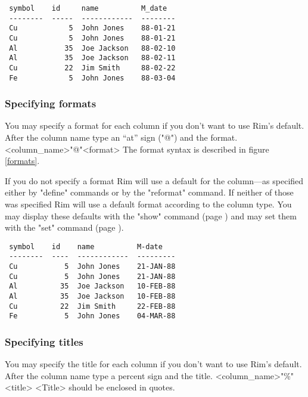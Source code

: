  
 \begin{verbatim}
 symbol    id     name          M_date
 --------  -----  ------------  --------
 Cu            5  John Jones    88-01-21
 Cu            5  John Jones    88-01-21
 Al           35  Joe Jackson   88-02-10
 Al           35  Joe Jackson   88-02-11
 Cu           22  Jim Smith     88-02-22
 Fe            5  John Jones    88-03-04
 \end{verbatim}
 \enddemo
 
 
\subsubsection{Specifying formats}
\label{format-spec}
You may specify a format for each column if you don't want to use
Rim's default. After the column name type an ``at'' sign ("@") and the format.
\<<column_name>"@"<format>\>
The format syntax is described in figure \ref{formats}.
 
 
If you do not specify a format Rim will use a default
for the column---as specified either by "define" commands or by the
"reformat" command.  If neither of those was specified Rim will
use a default format according to the column type.
You may display these defaults with the "show" command (page \pageref{show})
and may set them with the "set" command (page \pageref{set}).
 
\label{sel-dem1}
\begin{verbatim}
 symbol    id    name          M-date
 --------  ----  ------------  ---------
 Cu           5  John Jones    21-JAN-88
 Cu           5  John Jones    21-JAN-88
 Al          35  Joe Jackson   10-FEB-88
 Al          35  Joe Jackson   10-FEB-88
 Cu          22  Jim Smith     22-FEB-88
 Fe           5  John Jones    04-MAR-88
\end{verbatim}
\enddemo
 
 
\subsubsection{Specifying titles}
You may specify the title for each column if you don't want to use
Rim's default. After the column name type a percent sign and the title.
\<<column_name>"\%"<title>\>
<Title> should be enclosed in quotes.
 
